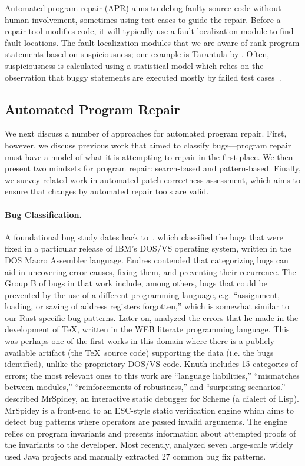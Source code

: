 Automated program repair (APR) aims to debug faulty source code without human involvement, sometimes using test cases to guide the repair. Before a repair tool modifies code, it will typically use a fault localization module to find fault locations. The fault localization modules that we are aware of rank program statements based on suspiciousness; one example is Tarantula by \cite{jones2005empirical}. Often, suspiciousness is calculated using a statistical model which relies on the observation that buggy statements are executed mostly by failed test cases~\citep{naish2009spectral,xie2013theoretical}.

\subsection{Automated Program Repair}
We next discuss a number of approaches for automated program repair. First, however, we discuss previous work that aimed to classify bugs---program repair must have a model of what it is attempting to repair in the first place. We then present two mindsets for program repair: search-based and pattern-based. Finally, we survey related work in automated patch correctness assessment, which aims to ensure that changes by automated repair tools are valid.

\paragraph{Bug Classification.}
A foundational bug study dates back to~\cite{endres1975analysis}, which classified the bugs that were fixed in a particular release of IBM's DOS/VS operating system, written in the DOS Macro Assembler language. Endres contended that categorizing bugs can aid in uncovering error causes, fixing them, and preventing their recurrence. The Group B of bugs in that work include, among others, bugs that could be prevented by the use of a different programming language, e.g. ``assignment, loading, or saving of address registers forgotten,'' which is somewhat similar to our Rust-specific bug patterns. Later on, \cite{knuth89:_error_tex} analyzed the errors that he made in the development of \TeX, written in the WEB literate programming language. This was perhaps one of the first works in this domain where there is a publicly-available artifact (the \TeX~source code) supporting the data (i.e. the bugs identified), unlike the proprietary DOS/VS code. Knuth includes 15 categories of errors; the most relevant ones to this work are ``language liabilities,'' ``mismatches between modules,'' ``reinforcements of robustness,'' and ``surprising scenarios.'' \cite{flanagan1998new} described MrSpidey, an interactive static debugger for Scheme (a dialect of Lisp). MrSpidey is a front-end to an ESC-style static verification engine which aims to detect bug patterns where operators are passed invalid arguments. The engine relies on program invariants and presents information about attempted proofs of the invariants to the developer. Most recently, \cite{pan2009toward} analyzed seven large-scale widely used Java projects and manually extracted 27 common bug fix patterns.

